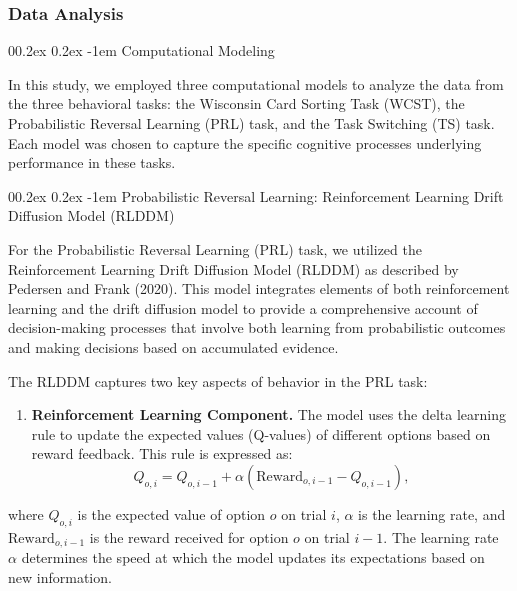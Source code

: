 \documentclass[
  man]{apa6}
\makeatletter
\let\oldparagraph\paragraph
\renewcommand{\paragraph}{
    \@ifstar
      \xxxParagraphStar
      \xxxParagraphNoStar
  }
\newcommand{\xxxParagraphStar}[1]{\oldparagraph*{#1}\mbox{}}
\newcommand{\xxxParagraphNoStar}[1]{\oldparagraph{#1}\mbox{}}
\providecommand{\tightlist}{%
  \setlength{\itemsep}{0pt}\setlength{\parskip}{0pt}}
\renewcommand{\paragraph}{\@startsection{paragraph}{4}{\parindent}%
  {0\baselineskip \@plus 0.2ex \@minus 0.2ex}%
  {-1em}%
  {\normalfont\normalsize\bfseries\itshape\typesectitle}}
\makeatother
\begin{document}
\subsubsection{Data Analysis}\label{data-analysis-2}

\paragraph{Computational Modeling}\label{computational-modeling-1}

In this study, we employed three computational models to analyze the data from the three behavioral tasks: the Wisconsin Card Sorting Task (WCST), the Probabilistic Reversal Learning (PRL) task, and the Task Switching (TS) task. Each model was chosen to capture the specific cognitive processes underlying performance in these tasks.

\paragraph{Probabilistic Reversal Learning: Reinforcement Learning Drift Diffusion Model (RLDDM)}\label{probabilistic-reversal-learning-reinforcement-learning-drift-diffusion-model-rlddm}

For the Probabilistic Reversal Learning (PRL) task, we utilized the Reinforcement Learning Drift Diffusion Model (RLDDM) as described by Pedersen and Frank (2020). This model integrates elements of both reinforcement learning and the drift diffusion model to provide a comprehensive account of decision-making processes that involve both learning from probabilistic outcomes and making decisions based on accumulated evidence.

The RLDDM captures two key aspects of behavior in the PRL task:

\begin{enumerate}
\def\labelenumi{\arabic{enumi}.}
\tightlist
\item
  \textbf{Reinforcement Learning Component.} The model uses the delta learning rule to update the expected values (Q-values) of different options based on reward feedback. This rule is expressed as:
  \[
    Q_{o,i} = Q_{o,i-1} + \alpha ( \text{Reward}_{o,i-1} - Q_{o,i-1} ),
    \]
\end{enumerate}

where \(Q_{o,i}\) is the expected value of option \(o\) on trial \(i\), \(\alpha\) is the learning rate, and \(\text{Reward}_{o,i-1}\) is the reward received for option \(o\) on trial \(i-1\). The learning rate \(\alpha\) determines the speed at which the model updates its expectations based on new information.
\end{document}

